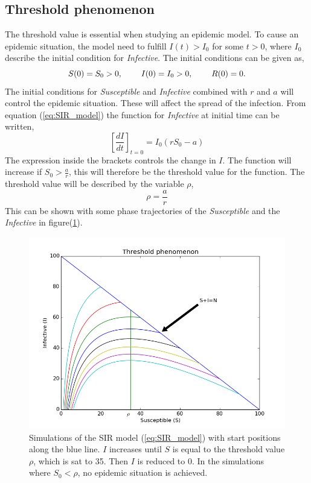 \documentclass[%
twoside,                 %
final,                   %
10pt]{article}
\begin{document}
\subsection{Threshold phenomenon}
The threshold value is essential when studying an epidemic model. To cause an epidemic situation, the model need to fulfill $I(t)> I_0$ for some $t>0$, where $I_0$ describe the initial condition for \emph{Infective}. The initial conditions can be given as,
\begin{equation}
S(0)=S_0 > 0,\hspace{8mm} I(0)=I_0>0,\hspace{8mm} R(0) =0.
\end{equation}
The initial conditions for \emph{Susceptible} and \emph{Infective} combined with $r$ and $a$ will control the epidemic situation. These will affect the spread of the infection. From equation (\ref{eq:SIR_model}) the function for \emph{Infective} at initial time can be written,
\begin{equation}
\left[\frac{dI}{dt}\right]_{t=0} = I_0(rS_0-a)
\end{equation}
The expression inside the brackets controls the change in $I$. The function will increase if $S_0 > \frac{a}{r}$, this will therefore be the threshold value for the function. The threshold value will be described by the variable $\rho$,
\begin{equation} \label{eq:threshold_value}
\rho = \frac{a}{r}
\end{equation}
This can be shown with some phase trajectories of the \emph{Susceptible} and the \emph{Infective} in figure(\ref{fig:threshold_phenomenon}).  


\begin{figure}[ht]
  \centerline{\includegraphics[width=0.9\linewidth]{plots/threshold_phenomenon.png}}
  \caption{
  \label{fig:threshold_phenomenon} Simulations of the SIR model (\ref{eq:SIR_model}) with start positions along the blue line. $I$ increases until $S$ is equal to the threshold value $\rho$, which is sat to 35. Then $I$ is reduced to 0. In the simulations where $S_0 < \rho$, no epidemic situation is achieved.
  }
\end{figure}
\end{document}
